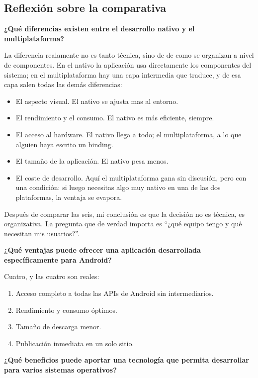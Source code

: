 \documentclass[11pt,a4paper]{article}
\newcommand{\campo}[1]{\textbf{\color{navy}#1}}
\begin{document}
	\subsection{Reflexión sobre la comparativa}
	
	\campo{¿Qué diferencias existen entre el desarrollo nativo y el multiplataforma?}
	
	La diferencia realamente no es tanto técnica, sino de de como se organizan a nivel de componentes. En el nativo la aplicación usa directamente los componentes del sistema; en el multiplataforma hay una capa intermedia que traduce, y de esa capa salen todas las demás diferencias:
	\begin{itemize}[leftmargin=*,itemsep=0.2em,topsep=0.2em]
		\item El aspecto visual. El nativo se ajusta mas al entorno.
		\item El rendimiento y el consumo. El nativo es más eficiente, siempre.
		\item El acceso al hardware. El nativo llega a todo; el multiplataforma, a lo que alguien haya escrito un binding.
		\item El tamaño de la aplicación. El nativo pesa menos.
		\item El coste de desarrollo. Aquí el multiplataforma gana sin discusión, pero con una condición: si luego necesitas algo muy nativo en una de las dos plataformas, la ventaja se evapora.
	\end{itemize}
	
	Después de comparar las seis, mi conclusión es que la decisión no es técnica, es organizativa. La pregunta que de verdad importa es \enquote{¿qué equipo tengo y qué necesitan mis usuarios?}.
	
	\campo{¿Qué ventajas puede ofrecer una aplicación desarrollada específicamente para Android?}
	
	Cuatro, y las cuatro son reales:
	\begin{enumerate}[leftmargin=*,itemsep=0.1em]
		\item Acceso completo a todas las APIs de Android sin intermediarios.
		\item Rendimiento y consumo óptimos.
		\item Tamaño de descarga menor.
		\item Publicación inmediata en un solo sitio.
	\end{enumerate}
	
	\campo{¿Qué beneficios puede aportar una tecnología que permita desarrollar para varios sistemas operativos?}
	
\end{document}
